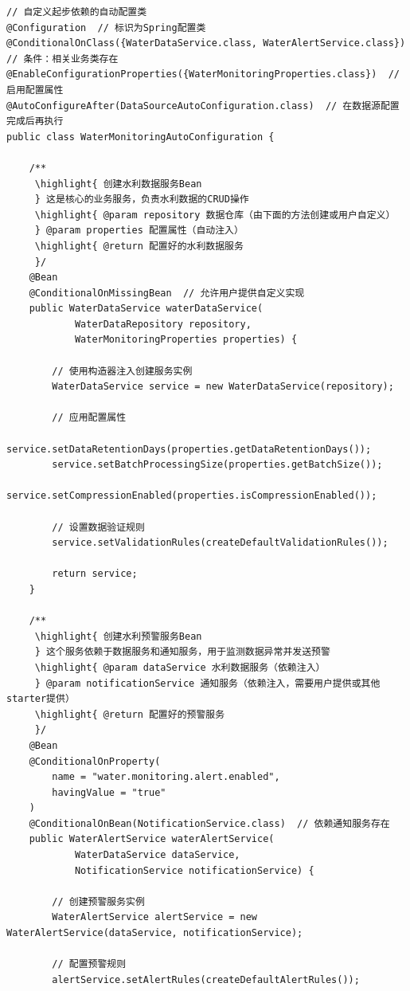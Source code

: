 \begin{lstlisting}[style=java]
// 自定义起步依赖的自动配置类
@Configuration  // 标识为Spring配置类
@ConditionalOnClass({WaterDataService.class, WaterAlertService.class})  // 条件：相关业务类存在
@EnableConfigurationProperties({WaterMonitoringProperties.class})  // 启用配置属性
@AutoConfigureAfter(DataSourceAutoConfiguration.class)  // 在数据源配置完成后再执行
public class WaterMonitoringAutoConfiguration {
    
    /**
     \highlight{ 创建水利数据服务Bean
     } 这是核心的业务服务，负责水利数据的CRUD操作
     \highlight{ @param repository 数据仓库（由下面的方法创建或用户自定义）
     } @param properties 配置属性（自动注入）
     \highlight{ @return 配置好的水利数据服务
     }/
    @Bean
    @ConditionalOnMissingBean  // 允许用户提供自定义实现
    public WaterDataService waterDataService(
            WaterDataRepository repository,
            WaterMonitoringProperties properties) {
        
        // 使用构造器注入创建服务实例
        WaterDataService service = new WaterDataService(repository);
        
        // 应用配置属性
        service.setDataRetentionDays(properties.getDataRetentionDays());
        service.setBatchProcessingSize(properties.getBatchSize());
        service.setCompressionEnabled(properties.isCompressionEnabled());
        
        // 设置数据验证规则
        service.setValidationRules(createDefaultValidationRules());
        
        return service;
    }
    
    /**
     \highlight{ 创建水利预警服务Bean
     } 这个服务依赖于数据服务和通知服务，用于监测数据异常并发送预警
     \highlight{ @param dataService 水利数据服务（依赖注入）
     } @param notificationService 通知服务（依赖注入，需要用户提供或其他starter提供）
     \highlight{ @return 配置好的预警服务
     }/
    @Bean
    @ConditionalOnProperty(
        name = "water.monitoring.alert.enabled", 
        havingValue = "true"
    )
    @ConditionalOnBean(NotificationService.class)  // 依赖通知服务存在
    public WaterAlertService waterAlertService(
            WaterDataService dataService,
            NotificationService notificationService) {
        
        // 创建预警服务实例
        WaterAlertService alertService = new WaterAlertService(dataService, notificationService);
        
        // 配置预警规则
        alertService.setAlertRules(createDefaultAlertRules());
        

\end{lstlisting}
